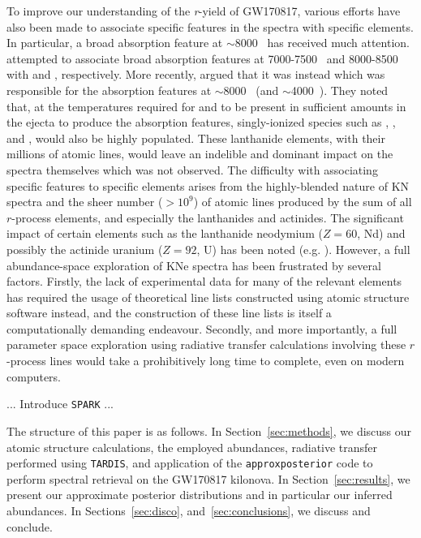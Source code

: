 \documentclass[twocolumn]{aastex63}
\begin{document}
To improve our understanding of the \textit{r}-yield of GW170817, various efforts have also been made to associate specific features in the spectra with specific elements. In particular, a broad absorption feature at $\sim$8000~\text{\AA} has received much attention. \cite{smartt17} attempted to associate broad absorption features at 7000-7500~\text{\AA} and 8000-8500~\text{\AA} with  and , respectively. More recently, \cite{watson19} argued that it was instead  which was responsible for the absorption features at $\sim$8000~\text{\AA} (and $\sim$4000~\text{\AA}). They noted that, at the temperatures required for  and  to be present in sufficient amounts in the ejecta to produce the absorption features, singly-ionized species such as , , and , would also be highly populated. These lanthanide elements, with their millions of atomic lines, would leave an indelible and dominant impact on the spectra themselves which was not observed. The difficulty with associating specific features to specific elements arises from the highly-blended nature of KN spectra and the sheer number ($>10^9$) of atomic lines produced by the sum of all $r$-process elements, and especially the lanthanides and actinides. The significant impact of certain elements such as the lanthanide neodymium ($Z=60$, Nd) and possibly the actinide uranium ($Z=92$, U) has been noted (e.g. \citealt{kasen13, kasen17, even19}). However, a full abundance-space exploration of KNe spectra has been frustrated by several factors. Firstly, the lack of experimental data for many of the relevant elements has required the usage of theoretical line lists constructed using atomic structure software instead, and the construction of these line lists is itself a computationally demanding endeavour. Secondly, and more importantly, a full parameter space exploration using radiative transfer calculations involving these $r$-process lines would take a prohibitively long time to complete, even on modern computers.  


... Introduce \texttt{SPARK} ...

The structure of this paper is as follows. In Section~\ref{sec:methods}, we discuss our atomic structure calculations, the employed abundances, radiative transfer performed using \texttt{TARDIS}, and application of the \texttt{approxposterior} code to perform spectral retrieval on the GW170817 kilonova. In Section~\ref{sec:results}, we present our approximate posterior distributions and in particular our inferred abundances. In Sections~\ref{sec:disco}, and~\ref{sec:conclusions}, we discuss and conclude.
\end{document}
